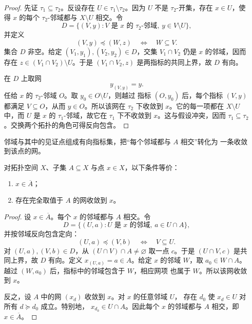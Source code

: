 \begin{proof}
先证 \(\tau_1\subseteq\tau_2\)。反设存在 \(U\in\tau_1\setminus\tau_2\)。因为
\(U\) 不是 \(\tau_2\)-开集，存在 \(x\in U\)，使得 \(x\) 的每个
\(\tau_2\)-邻域都与 \(X\setminus U\) 相交。令
\[
 D=\{(V,y):V\text{ 是 }x\text{ 的 }\tau_2\text{-邻域},\ y\in V\setminus U\},
\]
并定义
\[
 (V,y)\preceq(W,z)\quad\Longleftrightarrow\quad W\subseteq V.
\]
集合 \(D\) 非空。给定 \((V_1,y_1),(V_2,y_2)\in D\)，交集
\(V_1\cap V_2\) 仍是 \(x\) 的邻域，因而存在
\(z\in(V_1\cap V_2)\setminus U\)。于是
\((V_1\cap V_2,z)\) 是两指标的共同上界，故 \(D\) 有向。

在 \(D\) 上取网
\[
 y_{(V,y)}=y.
\]
任给 \(x\) 的 \(\tau_2\)-邻域 \(O\)。取 \(y_0\in O\setminus U\)，则越过
指标 \((O,y_0)\) 后，每个指标 \((V,y)\) 都满足 \(V\subseteq O\)，从而
\(y\in O\)。所以该网在 \(\tau_2\) 下收敛到 \(x\)。它的每一项都在
\(X\setminus U\) 中，而 \(U\) 是 \(x\) 的 \(\tau_1\)-邻域，故它在
\(\tau_1\) 下不收敛到 \(x\)。这与假设冲突，因而
\(\tau_1\subseteq\tau_2\)。交换两个拓扑的角色可得反向包含。
\end{proof}

邻域与其中的见证点组成有向指标集，把“每个邻域都与 \(A\) 相交”转化为
一条收敛到该点的网。

\begin{proposition}[闭包的网判据]
对拓扑空间 \(X\)、子集 \(A\subseteq X\) 与点 \(x\in X\)，以下条件等价：
\begin{enumerate}
  \item \(x\in\overline A\)；
  \item 存在完全取值于 \(A\) 的网收敛到 \(x\)。
\end{enumerate}
\label{ch1:prop:closure-net}
\end{proposition}

\begin{proof}
设 \(x\in\overline A\)。每个 \(x\) 的邻域都与 \(A\) 相交。令
\[
 D=\{(U,a):U\text{ 是 }x\text{ 的邻域},\ a\in U\cap A\},
\]
并按邻域反向包含定向：
\[
 (U,a)\preceq(V,b)\quad\Longleftrightarrow\quad V\subseteq U.
\]
对 \((U,a),(V,b)\in D\)，从 \((U\cap V)\cap A\neq\varnothing\) 取一点
\(c\)。于是 \((U\cap V,c)\) 是共同上界，故 \(D\) 有向。定义
\(x_{(U,a)}=a\in A\)。给定 \(x\) 的邻域 \(W\)，取
\(a_0\in W\cap A\)。越过 \((W,a_0)\) 后，指标中的邻域包含于 \(W\)，相应网项
也属于 \(W\)。所以该网收敛到 \(x\)。

反之，设 \(A\) 中的网 \((x_d)\) 收敛到 \(x\)。对 \(x\) 的任意邻域 \(U\)，
存在 \(d_0\) 使 \(x_d\in U\) 对所有 \(d\succeq d_0\) 成立。特别地，
\(x_{d_0}\in U\cap A\)。因此每个 \(x\) 的邻域都与 \(A\) 相交，即
\(x\in\overline A\)。
\end{proof}

